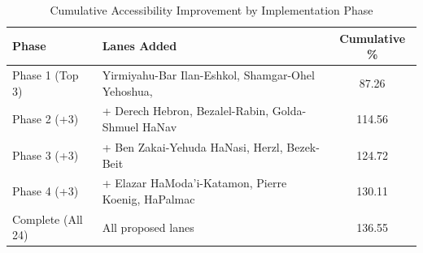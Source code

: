 \begin{table}[H]
\centering
\caption{Cumulative Accessibility Improvement by Implementation Phase}
\label{tab:phases}
\begin{tabular}{@{}llc@{}}
\toprule
\textbf{Phase} & \textbf{Lanes Added} & \textbf{Cumulative \%} \\
\midrule
Phase 1 (Top 3) & Yirmiyahu-Bar Ilan-Eshkol, Shamgar-Ohel Yehoshua,  & 87.26 \\
Phase 2 (+3) & + Derech Hebron, Bezalel-Rabin, Golda-Shmuel HaNav & 114.56 \\
Phase 3 (+3) & + Ben Zakai-Yehuda HaNasi, Herzl, Bezek-Beit & 124.72 \\
Phase 4 (+3) & + Elazar HaModa'i-Katamon, Pierre Koenig, HaPalmac & 130.11 \\
Complete (All 24) & All proposed lanes & 136.55 \\
\bottomrule
\end{tabular}
\end{table}
